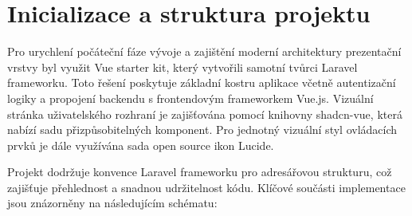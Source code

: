 \section{Inicializace a struktura projektu}
Pro urychlení počáteční fáze vývoje a zajištění moderní architektury prezentační vrstvy byl využit Vue starter kit, který vytvořili samotní tvůrci Laravel frameworku. Toto řešení poskytuje základní kostru aplikace včetně autentizační logiky a propojení backendu s frontendovým frameworkem Vue.js. Vizuální stránka uživatelského rozhraní je zajišťována pomocí knihovny \mbox{shadcn-vue}, která nabízí sadu přizpůsobitelných komponent. Pro jednotný vizuální styl ovládacích prvků je dále využívána sada open source ikon Lucide.

Projekt dodržuje konvence Laravel frameworku pro adresářovou strukturu, což zajišťuje přehlednost a snadnou udržitelnost kódu. Klíčové součásti implementace jsou znázorněny na následujícím schématu:

\vspace{5pt}

\vspace{10pt}